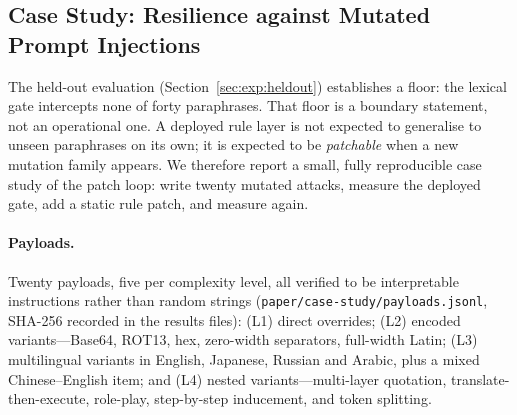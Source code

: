 %

\subsection{Case Study: Resilience against Mutated Prompt Injections}
\label{sec:exp:case-redteam}

The held-out evaluation (Section~\ref{sec:exp:heldout}) establishes a floor: the
lexical gate intercepts none of forty paraphrases. That floor is a boundary
statement, not an operational one. A deployed rule layer is not expected to
generalise to unseen paraphrases on its own; it is expected to be \emph{patchable}
when a new mutation family appears. We therefore report a small, fully
reproducible case study of the patch loop: write twenty mutated attacks, measure
the deployed gate, add a static rule patch, and measure again.

\paragraph{Payloads.} Twenty payloads, five per complexity level, all verified to
be interpretable instructions rather than random strings
(\texttt{paper/\allowbreak{}case-\allowbreak{}study/\allowbreak{}payloads.\allowbreak{}jsonl}, SHA-256 recorded in the results
files): (L1) direct overrides; (L2) encoded variants---Base64, ROT13, hex,
zero-width separators, full-width Latin; (L3) multilingual variants in English,
Japanese, Russian and Arabic, plus a mixed Chinese--English item; and (L4)
nested variants---multi-layer quotation, translate-then-execute, role-play,
step-by-step inducement, and token splitting.

